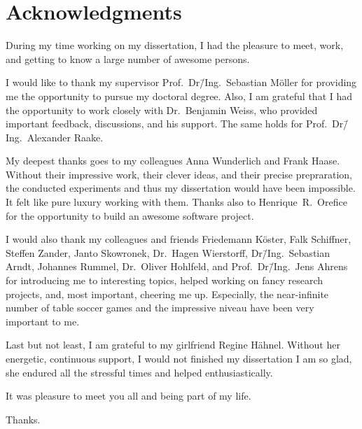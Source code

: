 
\bigskip

\begingroup
\let\clearpage\relax
\let\cleardoublepage\relax
\chapter*{Acknowledgments}
During my time working on my dissertation, I had the pleasure to meet, work, and getting to know a large number of awesome persons.

I would like to thank my supervisor Prof.~Dr\=/Ing.~Sebastian Möller for providing me the opportunity to pursue my doctoral degree.
Also, I am grateful that I had the opportunity to work closely with Dr.~Benjamin Weiss, who provided important feedback, discussions, and his support.
The same holds for Prof.~Dr\=/Ing.~Alexander Raake.

My deepest thanks goes to my colleagues Anna Wunderlich and Frank Haase.
Without their impressive work, their clever ideas, and their precise prepraration, the conducted experiments and thus my dissertation would have been impossible.
It felt like pure luxury working with them.
Thanks also to Henrique~R.~Orefice for the opportunity to build an awesome software project.

I would also thank my colleagues and friends Friedemann Köster, Falk Schiffner, Steffen Zander, Janto Skowronek, Dr.~Hagen Wierstorff, Dr\=/Ing.~Sebastian Arndt, Johannes Rummel, Dr.~Oliver Hohlfeld, and Prof.~Dr\=/Ing.~Jens Ahrens for introducing me to interesting topics, helped working on fancy research projects, and, most important, cheering me up.
Especially, the near-infinite number of table soccer games and the impressive niveau have been very important to me.

Last but not least, I am grateful to my girlfriend Regine Hähnel.
Without her energetic, continuous support, I would not finished my dissertation
I am so glad, she endured all the stressful times and helped enthusiastically.

\bigskip
It was pleasure to meet you all and being part of my life.

\bigskip
Thanks.

\endgroup
